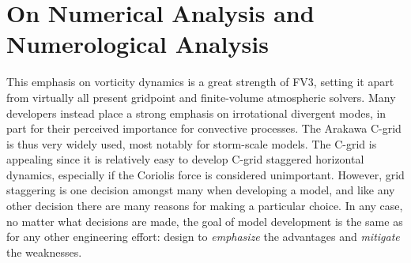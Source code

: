 \documentclass[10pt,letterpaper,margin=1in]{memoir}
\begin{document}
\section{On Numerical Analysis and Numerological Analysis} \label{sec:numerology}

This emphasis on vorticity dynamics is a great strength of FV3, setting it apart from virtually all present gridpoint and finite-volume atmospheric solvers. Many developers instead place a strong emphasis on irrotational divergent modes, in part for their perceived importance for convective processes. The Arakawa C-grid is thus very widely used, most notably for storm-scale models. The C-grid is appealing since it is relatively easy to develop C-grid staggered horizontal dynamics, especially if the Coriolis force is considered unimportant. However, grid staggering is one decision amongst many when developing a model, and like any other decision there are many reasons for making a particular choice. In any case, no matter what decisions are made, the goal of model development is the same as for any other engineering effort: design to \textit{emphasize} the advantages and \textit{mitigate} the weaknesses.
\end{document}
